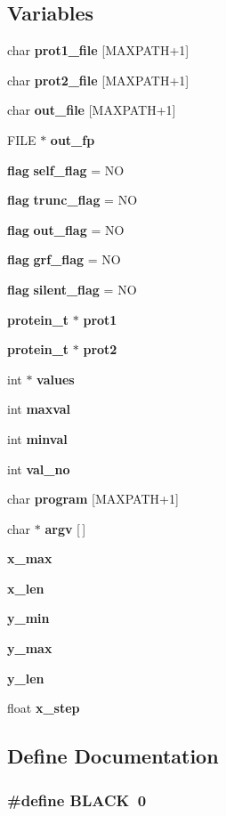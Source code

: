 \subsection*{Variables}
\begin{CompactItemize}
\item 
char {\bf prot1\_\-file} [MAXPATH+1]
\item 
char {\bf prot2\_\-file} [MAXPATH+1]
\item 
char {\bf out\_\-file} [MAXPATH+1]
\item 
FILE $\ast$ {\bf out\_\-fp}
\item 
{\bf flag} {\bf self\_\-flag} = NO
\item 
{\bf flag} {\bf trunc\_\-flag} = NO
\item 
{\bf flag} {\bf out\_\-flag} = NO
\item 
{\bf flag} {\bf grf\_\-flag} = NO
\item 
{\bf flag} {\bf silent\_\-flag} = NO
\item 
{\bf protein\_\-t} $\ast$ {\bf prot1}
\item 
{\bf protein\_\-t} $\ast$ {\bf prot2}
\item 
int $\ast$ {\bf values}
\item 
int {\bf maxval}
\item 
int {\bf minval}
\item 
int {\bf val\_\-no}
\item 
char {\bf program} [MAXPATH+1]
\item 
char $\ast$ {\bf argv} [$\,$]
\item 
{\bf x\_\-max}
\item 
{\bf x\_\-len}
\item 
{\bf y\_\-min}
\item 
{\bf y\_\-max}
\item 
{\bf y\_\-len}
\item 
float {\bf x\_\-step}
\end{CompactItemize}


\subsection{Define Documentation}
\subsubsection{\setlength{\rightskip}{0pt plus 5cm}\#define BLACK\ 0}\label{Pilar__9_8c_a2}


